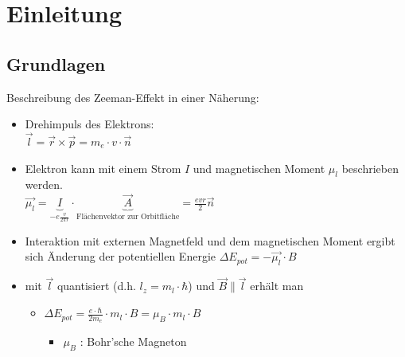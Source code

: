 
\section{Einleitung}


    \subsection{Grundlagen}
        \begin{myframe}{\subsecname}
            Beschreibung des Zeeman-Effekt in einer Näherung:
            \begin{itemize}
                \item Drehimpuls des Elektrons: \\ $\vec{l} = \vec{r} \times \vec{p} = m_e \cdot v \cdot \vec{n}$
                \item Elektron kann mit einem Strom $ I $ und magnetischen Moment $\mu_{l}$ beschrieben werden. \\
                    $\vec{\mu_{l}} = \underbrace{I}_{- e \frac{v}{2 \pi r}} \cdot \underbrace{\vec{A}}_{\text{Flächenvektor zur Orbitfläche}} = \frac{evr}{2} \vec{n}$
                \item Interaktion mit externen Magnetfeld und dem magnetischen Moment ergibt sich Änderung der potentiellen Energie $\Delta E_{pot}=-\vec{\mu_l}\cdot B$
                \item mit $\vec{l}$ quantisiert (d.h. $l_z = m_l \cdot \hbar$) und $\vec{B} \parallel \vec{l}$ erhält man
                \begin{itemize}
                    \item[] $\Delta E_{pot} = \frac{e \cdot \hbar}{2m_e} \cdot m_l \cdot B = \mu_B \cdot m_l \cdot B $
                    \begin{itemize}
                        \item[] $\mu_{B}$ : Bohr'sche Magneton
                    \end{itemize}
                \end{itemize}
            \end{itemize}
        \end{myframe}

